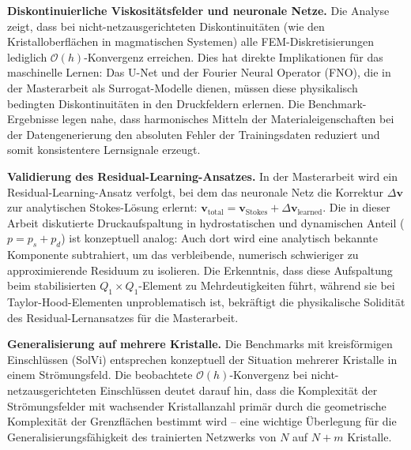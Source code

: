 \documentclass[a4paper,12pt]{article}
\begin{document}
\textbf{Diskontinuierliche Viskositätsfelder und neuronale Netze.} Die Analyse zeigt, dass bei nicht-netzausgerichteten Diskontinuitäten (wie den Kristalloberflächen in magmatischen Systemen) alle FEM-Diskretisierungen lediglich $\mathcal{O}(h)$-Konvergenz erreichen. Dies hat direkte Implikationen für das maschinelle Lernen: Das U-Net und der Fourier Neural Operator (FNO), die in der Masterarbeit als Surrogat-Modelle dienen, müssen diese physikalisch bedingten Diskontinuitäten in den Druckfeldern erlernen. Die Benchmark-Ergebnisse legen nahe, dass harmonisches Mitteln der Materialeigenschaften bei der Datengenerierung den absoluten Fehler der Trainingsdaten reduziert und somit konsistentere Lernsignale erzeugt.

\textbf{Validierung des Residual-Learning-Ansatzes.} In der Masterarbeit wird ein Residual-Learning-Ansatz verfolgt, bei dem das neuronale Netz die Korrektur $\Delta \mathbf{v}$ zur analytischen Stokes-Lösung erlernt: $\mathbf{v}_\text{total} = \mathbf{v}_\text{Stokes} + \Delta \mathbf{v}_\text{learned}$. Die in dieser Arbeit diskutierte Druckaufspaltung in hydrostatischen und dynamischen Anteil ($p = p_s + p_d$) ist konzeptuell analog: Auch dort wird eine analytisch bekannte Komponente subtrahiert, um das verbleibende, numerisch schwieriger zu approximierende Residuum zu isolieren. Die Erkenntnis, dass diese Aufspaltung beim stabilisierten $Q_1 \times Q_1$-Element zu Mehrdeutigkeiten führt, während sie bei Taylor-Hood-Elementen unproblematisch ist, bekräftigt die physikalische Solidität des Residual-Lernansatzes für die Masterarbeit.

\textbf{Generalisierung auf mehrere Kristalle.} Die Benchmarks mit kreisförmigen Einschlüssen (SolVi) entsprechen konzeptuell der Situation mehrerer Kristalle in einem Strömungsfeld. Die beobachtete $\mathcal{O}(h)$-Konvergenz bei nicht-netzausgerichteten Einschlüssen deutet darauf hin, dass die Komplexität der Strömungsfelder mit wachsender Kristallanzahl primär durch die geometrische Komplexität der Grenzflächen bestimmt wird -- eine wichtige Überlegung für die Generalisierungsfähigkeit des trainierten Netzwerks von $N$ auf $N+m$ Kristalle.
\end{document}
